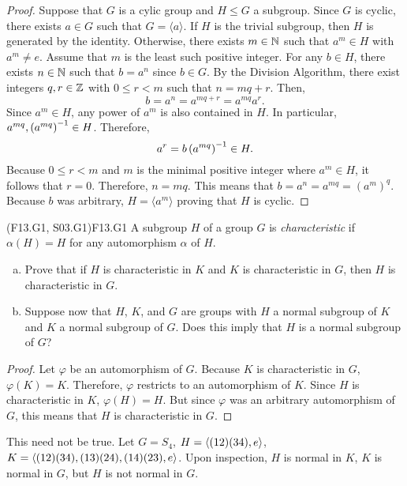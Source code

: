\documentclass[../../AlgebraQualSolutions.tex]{subfiles}
\begin{document}
	\begin{proof}
		Suppose that $G$ is a cylic group and $H \leq G$ a subgroup. Since $G$ is cyclic, there exists $a \in G$ such that $G = \langle a \rangle$. If $H$ is the trivial subgroup, then $H$ is generated by the identity. Otherwise, there exists $m \in \mathbb{N}$ such that $a^m \in H$ with $a^m \neq e$. Assume that $m$ is the least such positive integer. For any $b \in H$, there exists $n \in \mathbb{N}$ such that $b = a^n$ since $b \in G$. By the Division Algorithm, there exist integers $q,r \in \mathbb{Z}$ with $0 \leq r < m$ such that $n = mq + r$. Then,
			\[b = a^n = a^{mq+r} = a^{mq}a^r.\]
		Since $a^m \in H$, any power of $a^m$ is also contained in $H$. In particular, $a^{mq}, \left(a^{mq}\right)^{-1} \in H$. Therefore,
			\[a^r = b \left(a^{mq}\right)^{-1} \in H.\]
		Because $0 \leq r < m$ and $m$ is the minimal positive integer where $a^m \in H$, it follows that $r = 0$. Therefore, $n = mq$. This means that $b = a^n=a^{mq} = (a^m)^q$. Because $b$ was arbitrary, $H = \langle a^m \rangle$ proving that $H$ is cyclic.
	\end{proof}

	\begin{prob}{(F13.G1, S03.G1)}{F13.G1}
		A subgroup $H$ of a group $G$ is \emph{characteristic} if $\alpha(H) = H$ for any automorphism $\alpha$ of $H$.
		
		\begin{enumerate}[(a)]
			\item Prove that if $H$ is characteristic in $K$ and $K$ is characteristic in $G$, then $H$ is characteristic in $G$.
			\item Suppose now that $H$, $K$, and $G$ are groups with $H$ a normal subgroup of $K$ and $K$ a normal subgroup of $G$. Does this imply that $H$ is a normal subgroup of $G$?
		\end{enumerate}
	\end{prob}
	
	\begin{proof}
		Let $\varphi$ be an automorphism of $G$. Because $K$ is characteristic in $G$, $\varphi(K) = K$. Therefore, $\varphi$ restricts to an automorphism of $K$. Since $H$ is characteristic in $K$, $\varphi(H) = H$. But since $\varphi$ was an arbitrary automorphism of $G$, this means that $H$ is characteristic in $G$.
	\end{proof}
	
	\begin{solution}
	This need not be true. Let $G = S_4$, $H = \left\langle (12)(34),e \right\rangle$, $K = \left\langle (12)(34), (13)(24),(14)(23), e \right\rangle$. Upon inspection, $H$ is normal in $K$, $K$ is normal in $G$, but $H$ is not normal in $G$.
	\end{solution}
\end{document}

